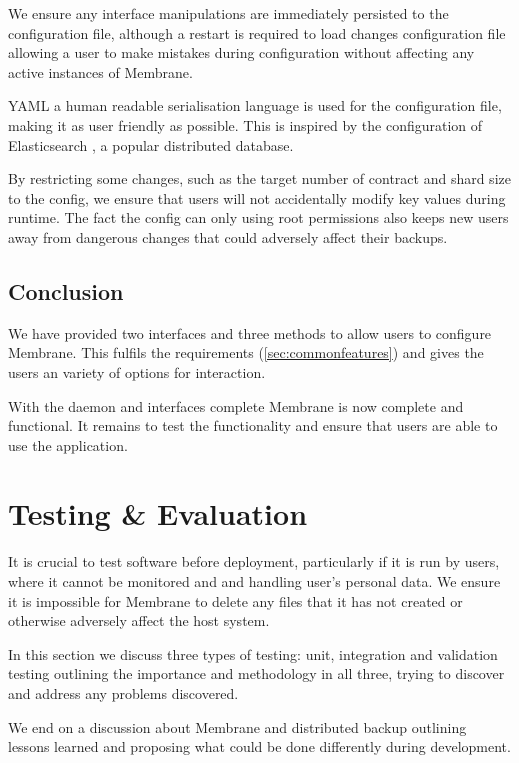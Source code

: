 \documentclass[11pt, a4paper, twoside]{report}
\begin{document}
We ensure any interface manipulations are immediately persisted to the configuration file, although a restart is required to load changes configuration file allowing a user to make mistakes during configuration without affecting any active instances of Membrane.

YAML a human readable serialisation language \citep{evans2009yaml} is used for the configuration file, making it as user friendly as possible. This is inspired by the configuration of Elasticsearch \citep{elastic2017config}, a popular distributed database.

By restricting some changes, such as the target number of contract and shard size to the config, we ensure that users will not accidentally modify key values during runtime. The fact the config can only using root permissions also keeps new users away from dangerous changes that could adversely affect their backups.

\section{Conclusion}

We have provided two interfaces and three methods to allow users to configure Membrane. This fulfils the requirements (\ref{sec:commonfeatures}) and gives the users an variety of options for interaction.

With the daemon and interfaces complete Membrane is now complete and functional. It remains to test the functionality and ensure that users are able to use the application.

\chapter{Testing \& Evaluation}

It is crucial to test software before deployment, particularly if it is run by users, where it cannot be monitored and and handling user's personal data. We ensure it is impossible for Membrane to delete any files that it has not created or otherwise adversely affect the host system.

In this section we discuss three types of testing: unit, integration and validation testing outlining the importance and methodology in all three, trying to discover and address any problems discovered.

We end on a discussion about Membrane and distributed backup outlining lessons learned and proposing what could be done differently during development.
\end{document}
